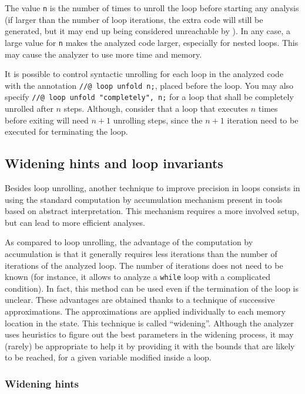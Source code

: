 \documentclass{frama-c-book}
\begin{document}
The value \lstinline$n$ is the number of times to unroll the loop before starting
any analysis (if larger than the number of loop iterations, the extra code will
still be generated, but it may end up being considered unreachable by \Eva{}).
In any case, a large value for \lstinline|n| makes the analyzed code larger,
especially for nested loops. This may cause the analyzer to use more time and
memory.

It is possible to control syntactic unrolling for each loop in the analyzed code
with the annotation \lstinline|//@ loop unfold n;|, placed before the loop.
You may also specify \lstinline|//@ loop unfold "completely", n;| for a loop
that shall be completely unrolled after $n$ steps. Although, consider that
a loop that executes $n$ times before exiting will need $n+1$ unrolling steps,
since the $n+1$ iteration need to be executed for terminating the loop.

\subsection{Widening hints and loop invariants}

Besides loop unrolling, another technique to improve precision in loops
consists in using the standard computation by accumulation mechanism present in
tools based on abstract interpretation. This mechanism requires a more involved
setup, but can lead to more efficient analyses.

As compared to loop unrolling, the advantage of the computation
by accumulation is that it generally requires less iterations
than the number of iterations of the analyzed loop. The number of
iterations does not need to be known (for instance, it allows to
analyze a \lstinline|while| loop with a complicated condition).
In fact, this method can be used even if the termination of
the loop is unclear. These advantages are obtained thanks to
a technique of successive approximations. The approximations
are applied individually to each memory location in the state.
This technique is called ``widening''.
Although the analyzer uses heuristics to figure out the best
parameters in the widening process, it may (rarely) be appropriate
to help it by providing it with the bounds that are likely to
be reached, for a given variable modified inside a loop.

\subsubsection{Widening hints}
\label{subsub:widen-hints}
\end{document}

